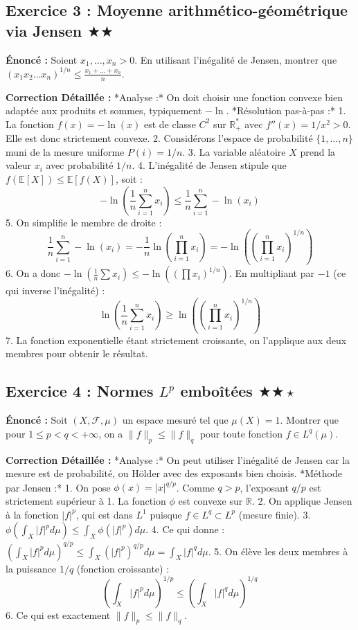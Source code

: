 \documentclass[11pt,a4paper]{article}
\begin{document}
\subsection*{Exercice 3 : Moyenne arithmético-géométrique via Jensen $\bigstar\bigstar$}

\textbf{Énoncé :} Soient $x_1, \dots, x_n > 0$. En utilisant l'inégalité de Jensen, montrer que $(x_1 x_2 \dots x_n)^{1/n} \le \frac{x_1 + \dots + x_n}{n}$.

\textbf{Correction Détaillée :}
*Analyse :* On doit choisir une fonction convexe bien adaptée aux produits et sommes, typiquement $-\ln$.
*Résolution pas-à-pas :*
1. La fonction $f(x) = -\ln(x)$ est de classe $C^2$ sur $\mathbb{R}_+^*$ avec $f''(x) = 1/x^2 > 0$. Elle est donc strictement convexe.
2. Considérons l'espace de probabilité $\{1, \dots, n\}$ muni de la mesure uniforme $P(i) = 1/n$.
3. La variable aléatoire $X$ prend la valeur $x_i$ avec probabilité $1/n$.
4. L'inégalité de Jensen stipule que $f(\mathbb{E}[X]) \le \mathbb{E}[f(X)]$, soit :
   $$-\ln\left(\frac{1}{n}\sum_{i=1}^n x_i\right) \le \frac{1}{n}\sum_{i=1}^n -\ln(x_i)$$
5. On simplifie le membre de droite :
   $$\frac{1}{n}\sum_{i=1}^n -\ln(x_i) = -\frac{1}{n}\ln\left(\prod_{i=1}^n x_i\right) = -\ln\left(\left(\prod_{i=1}^n x_i\right)^{1/n}\right)$$
6. On a donc $-\ln(\frac{1}{n}\sum x_i) \le -\ln((\prod x_i)^{1/n})$. En multipliant par $-1$ (ce qui inverse l'inégalité) :
   $$\ln\left(\frac{1}{n}\sum_{i=1}^n x_i\right) \ge \ln\left(\left(\prod_{i=1}^n x_i\right)^{1/n}\right)$$
7. La fonction exponentielle étant strictement croissante, on l'applique aux deux membres pour obtenir le résultat.


\subsection*{Exercice 4 : Normes $L^p$ emboîtées $\bigstar\bigstar\star$}

\textbf{Énoncé :} Soit $(X, \mathcal{F}, \mu)$ un espace mesuré tel que $\mu(X)=1$. Montrer que pour $1 \le p < q < +\infty$, on a $\|f\|_p \le \|f\|_q$ pour toute fonction $f \in L^q(\mu)$.

\textbf{Correction Détaillée :}
*Analyse :* On peut utiliser l'inégalité de Jensen car la mesure est de probabilité, ou Hölder avec des exposants bien choisis.
*Méthode par Jensen :*
1. On pose $\phi(x) = |x|^{q/p}$. Comme $q > p$, l'exposant $q/p$ est strictement supérieur à 1. La fonction $\phi$ est convexe sur $\mathbb{R}$.
2. On applique Jensen à la fonction $|f|^p$, qui est dans $L^1$ puisque $f \in L^q \subset L^p$ (mesure finie).
3. $\phi(\int_X |f|^p d\mu) \le \int_X \phi(|f|^p) d\mu$.
4. Ce qui donne : $\left(\int_X |f|^p d\mu\right)^{q/p} \le \int_X (|f|^p)^{q/p} d\mu = \int_X |f|^q d\mu$.
5. On élève les deux membres à la puissance $1/q$ (fonction croissante) :
   $$\left(\int_X |f|^p d\mu\right)^{1/p} \le \left(\int_X |f|^q d\mu\right)^{1/q}$$
6. Ce qui est exactement $\|f\|_p \le \|f\|_q$.
\end{document}

